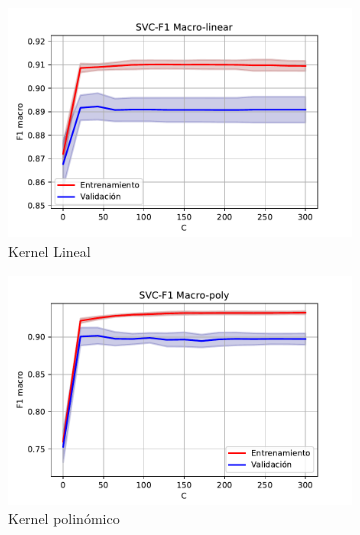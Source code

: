 \begin{figure}[H]
	\captionsetup{justification=centering}
	\centering
	\begin{subfigure}[b]{.45\linewidth}
		\includegraphics[width=\linewidth]{imagenes/resultados/svm/curvas_validacion/SVC-F1 Macro-linear.pdf}
		\caption{Kernel Lineal}
		\label{res:svc_vc_lineal}
	\end{subfigure}
	\begin{subfigure}[b]{.45\linewidth}
		\includegraphics[width=\linewidth]{imagenes/resultados/svm/curvas_validacion/SVC-F1 Macro-poly.pdf}
		\caption{Kernel polinómico}
		\label{res:svc_vc_poly}
	\end{subfigure}
	\begin{subfigure}[b]{.45\linewidth}

\end{subfigure}
\end{figure}

